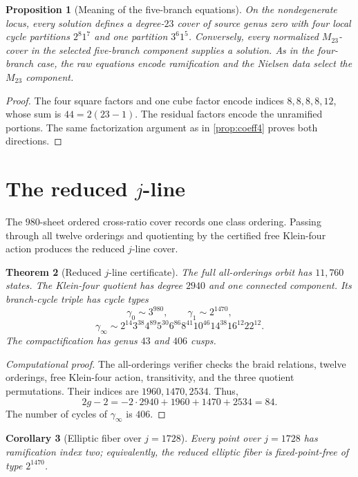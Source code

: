 \documentclass[11pt]{article}
\newtheorem{theorem}{Theorem}[section]
\newtheorem{proposition}[theorem]{Proposition}
\newtheorem{corollary}[theorem]{Corollary}
\theoremstyle{remark}
\begin{document}
\begin{proposition}[Meaning of the five-branch equations]\label{prop:coeff5}
On the nondegenerate locus, every solution defines a degree-$23$ cover of source genus zero with four local cycle partitions $2^8 1^7$ and one partition $3^6 1^5$.  Conversely, every normalized $M_{23}$-cover in the selected five-branch component supplies a solution.  As in the four-branch case, the raw equations encode ramification and the Nielsen data select the $M_{23}$ component.
\end{proposition}

\begin{proof}
The four square factors and one cube factor encode indices $8,8,8,8,12$, whose sum is $44=2(23-1)$.  The residual factors encode the unramified portions.  The same factorization argument as in \cref{prop:coeff4} proves both directions.
\end{proof}

\section{The reduced \texorpdfstring{$j$}{j}-line}\label{sec:reduced}

The $980$-sheet ordered cross-ratio cover records one class ordering.  Passing through all twelve orderings and quotienting by the certified free Klein-four action produces the reduced $j$-line cover.

\begin{theorem}[Reduced $j$-line certificate]\label{thm:reduced}
The full all-orderings orbit has $11{,}760$ states.  The Klein-four quotient has degree $2940$ and one connected component.  Its branch-cycle triple has cycle types
\[
 \gamma_0\sim3^{980},
 \qquad
 \gamma_1\sim2^{1470},
\]
\[
 \gamma_\infty\sim
 2^{14}3^{38}4^{89}5^{30}6^{86}8^{41}10^{46}14^{38}16^{12}22^{12}.
\]
The compactification has genus $43$ and $406$ cusps.
\end{theorem}

\begin{proof}[Computational proof]
The all-orderings verifier checks the braid relations, twelve orderings, free Klein-four action, transitivity, and the three quotient permutations.  Their indices are $1960,1470,2534$.  Thus,
\[
 2g-2=-2\cdot2940+1960+1470+2534=84.
\]
The number of cycles of $\gamma_\infty$ is $406$.
\end{proof}

\begin{corollary}[Elliptic fiber over $j=1728$]\label{cor:1728}
Every point over $j=1728$ has ramification index two; equivalently, the reduced elliptic fiber is fixed-point-free of type $2^{1470}$.
\end{corollary}
\end{document}
